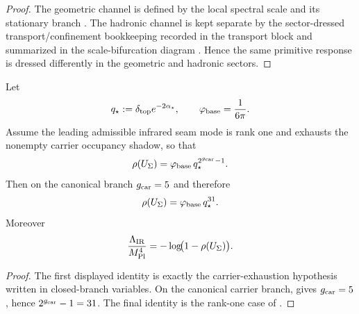 \begin{proof}
The geometric channel is defined by the local spectral scale and its stationary branch
. The hadronic channel is
kept separate by the sector-dressed transport/confinement bookkeeping recorded in the transport
block and summarized in the scale-bifurcation diagram . Hence the
same primitive response is dressed differently in the geometric and hadronic sectors.
\end{proof}

\begin{theorem}
\label{thm:carrier-exhausted-ir-seam-eigenvalue}
Let
\[
q_\star:=\delta_{\mathrm{top}} e^{-2\alpha_\star},
\qquad
\varphi_{\mathrm{base}}=\frac{1}{6\pi}.
\]
Assume the leading admissible infrared seam mode is rank one and exhausts the nonempty carrier
occupancy shadow, so that
\[
\rho(U_\Sigma)=\varphi_{\mathrm{base}}\,q_\star^{2^{g_{\mathrm{car}}}-1}.
\]
Then on the canonical branch $g_{\mathrm{car}}=5$ and therefore
\[
\rho(U_\Sigma)=\varphi_{\mathrm{base}}\,q_\star^{31}.
\]
Moreover
\[
\frac{\Lambda_{\mathrm{IR}}}{M_{\mathrm{Pl}}^4}
=
-\log\!\bigl(1-\rho(U_\Sigma)\bigr).
\]
\end{theorem}

\begin{proof}
The first displayed identity is exactly the carrier-exhaustion hypothesis written in closed-branch
variables. On the canonical carrier branch,  gives
$g_{\mathrm{car}}=5$, hence $2^{g_{\mathrm{car}}}-1=31$. The final identity is the rank-one case of
.
\end{proof}

